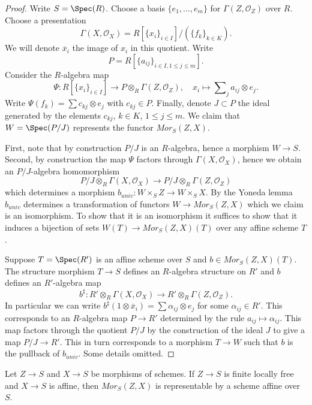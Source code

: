 \begin{proof}
Write $S = \Spec(R)$. Choose a basis $\{e_1, \ldots, e_m\}$
for $\Gamma(Z, \mathcal{O}_Z)$ over $R$. Choose a presentation
$$
\Gamma(X, \mathcal{O}_X) = R[\{x_i\}_{i \in I}]/(\{f_k\}_{k \in K}).
$$
We will denote $\overline{x}_i$ the image of $x_i$ in this quotient.
Write
$$
P = R[\{a_{ij}\}_{i \in I, 1 \leq j \leq m}].
$$
Consider the $R$-algebra map
$$
\Psi :
R[\{x_i\}_{i \in I}]
\longrightarrow
P \otimes_R \Gamma(Z, \mathcal{O}_Z), \quad
x_i \longmapsto \sum\nolimits_j a_{ij} \otimes e_j.
$$
Write $\Psi(f_k) = \sum c_{kj} \otimes e_j$ with $c_{kj} \in P$.
Finally, denote $J \subset P$ the ideal generated by the elements
$c_{kj}$, $k \in K$, $1 \leq j \leq m$. We claim that
$W = \Spec(P/J)$ represents the functor $\mathit{Mor}_S(Z, X)$.

\medskip\noindent
First, note that by construction $P/J$ is an $R$-algebra, hence
a morphism $W \to S$. Second, by construction the map
$\Psi$ factors through $\Gamma(X, \mathcal{O}_X)$, hence we obtain
an $P/J$-algebra homomorphism
$$
P/J \otimes_R \Gamma(X, \mathcal{O}_X)
\longrightarrow
P/J \otimes_R \Gamma(Z, \mathcal{O}_Z)
$$
which determines a morphism
$b_{univ} : W \times_S Z \to W \times_S X$.
By the Yoneda lemma $b_{univ}$ determines a
transformation of functors $W \to \mathit{Mor}_S(Z, X)$ which we
claim is an isomorphism. To show that it is an isomorphism it suffices
to show that it induces a bijection of sets
$W(T) \to \mathit{Mor}_S(Z, X)(T)$ over any affine
scheme $T$.

\medskip\noindent
Suppose $T = \Spec(R')$ is an affine scheme over $S$
and $b \in \mathit{Mor}_S(Z, X)(T)$. The structure morphism $T \to S$
defines an $R$-algebra structure on $R'$ and $b$ defines an $R'$-algebra map
$$
b^\sharp :
R' \otimes_R \Gamma(X, \mathcal{O}_X)
\longrightarrow
R' \otimes_R \Gamma(Z, \mathcal{O}_Z).
$$
In particular we can write
$b^\sharp(1 \otimes \overline{x}_i) = \sum \alpha_{ij} \otimes e_j$
for some $\alpha_{ij} \in R'$. This corresponds to an $R$-algebra map
$P \to R'$ determined by the rule $a_{ij} \mapsto \alpha_{ij}$. This
map factors through the quotient $P/J$ by the construction of the ideal
$J$ to give a map $P/J \to R'$. This in turn corresponds to a morphism
$T \to W$ such that $b$ is the pullback of $b_{univ}$.
Some details omitted.
\end{proof}

\begin{lemma}
\label{lemma-hom-from-finite-locally-free-into-affine}
Let $Z \to S$ and $X \to S$ be morphisms of schemes.
If $Z \to S$ is finite locally free and $X \to S$ is affine,
then $\mathit{Mor}_S(Z, X)$ is representable by a scheme
affine over $S$.
\end{lemma}

